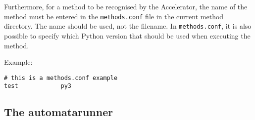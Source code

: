 \documentclass[a4paper]{article}
\begin{document}
Furthermore, for a method to be recognised by the Accelerator, the
name of the method must be entered in the \texttt{methods.conf} file
in the current method directory.  The name should be used, not the
filename.  In \texttt{methods.conf}, it is also possible to specify
which Python version that should be used when executing the method.

Example:
\begin{verbatim}
# this is a methods.conf example
test            py3
\end{verbatim}









\subsection{The automatarunner}
\end{document}
